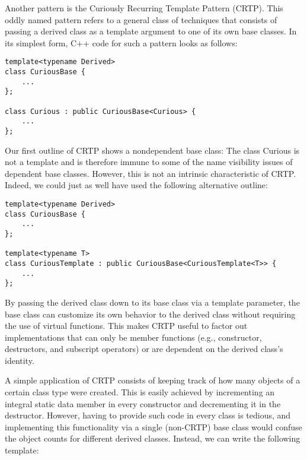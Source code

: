 
Another pattern is the Curiously Recurring Template Pattern (CRTP). This oddly named pattern refers to a general class of techniques that consists of passing a derived class as a template argument to one of its own base classes. In its simplest form, C++ code for such a pattern looks as follows:

\begin{lstlisting}[style=styleCXX]
template<typename Derived>
class CuriousBase {
	...
};

class Curious : public CuriousBase<Curious> {
	...
};
\end{lstlisting}

Our first outline of CRTP shows a nondependent base class: The class Curious is not a template and is therefore immune to some of the name visibility issues of dependent base classes. However, this is not an intrinsic characteristic of CRTP. Indeed, we could just as well have used the following alternative outline:

\begin{lstlisting}[style=styleCXX]
template<typename Derived>
class CuriousBase {
	...
};

template<typename T>
class CuriousTemplate : public CuriousBase<CuriousTemplate<T>> {
	...
};
\end{lstlisting}

By passing the derived class down to its base class via a template parameter, the base class can customize its own behavior to the derived class without requiring the use of virtual functions. This makes CRTP useful to factor out implementations that can only be member functions (e.g., constructor, destructors, and subscript operators) or are dependent on the derived class’s identity.

A simple application of CRTP consists of keeping track of how many objects of a certain class type were created. This is easily achieved by incrementing an integral static data member in every constructor and decrementing it in the destructor. However, having to provide such code in every class is tedious, and implementing this functionality via a single (non-CRTP) base class would confuse the object counts for different derived classes. Instead, we can write the following template:

